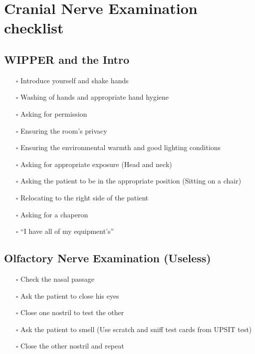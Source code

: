 \documentclass[
  13.5pt,
  a4paper,
  DIV=11,
  numbers=noendperiod]{scrreprt}
\providecommand{\tightlist}{%
  \setlength{\itemsep}{0pt}\setlength{\parskip}{0pt}}
\begin{document}

\chapter{Cranial Nerve Examination
checklist}\label{cranial-nerve-examination-checklist}

\section{WIPPER and the Intro}\label{wipper-and-the-intro-7}

\begin{itemize}
\tightlist
\item[$\square$]
  Introduce yourself and shake hands
\item[$\square$]
  Washing of hands and appropriate hand hygiene
\item[$\square$]
  Asking for permission
\item[$\square$]
  Ensuring the room's privacy
\item[$\square$]
  Ensuring the environmental warmth and good lighting conditions
\item[$\square$]
  Asking for appropriate exposure (Head and neck)
\item[$\square$]
  Asking the patient to be in the appropriate position (Sitting on a
  chair)
\item[$\square$]
  Relocating to the right side of the patient
\item[$\square$]
  Asking for a chaperon
\item[$\square$]
  ``I have all of my equipment's''
\end{itemize}

\section{Olfactory Nerve Examination
(Useless)}\label{olfactory-nerve-examination-useless}

\begin{itemize}
\tightlist
\item[$\square$]
  Check the nasal passage
\item[$\square$]
  Ask the patient to close his eyes
\item[$\square$]
  Close one nostril to test the other
\item[$\square$]
  Ask the patient to smell (Use scratch and sniff test cards from UPSIT
  test)
\item[$\square$]
  Close the other nostril and repeat
\end{itemize}
\end{document}

